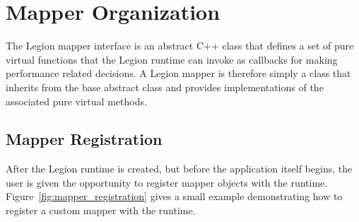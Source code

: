 \section{Mapper Organization}
\label{sec:mapping:org}

The Legion mapper interface is an abstract C++ class that defines a set of 
pure virtual functions that the Legion runtime can invoke as callbacks
for making performance related decisions. A Legion mapper is therefore 
simply a class that inherits from the base abstract class and provides 
implementations of the associated pure virtual methods.

\subsection{Mapper Registration}
\label{subsec:mapping:registration}

After the Legion runtime is created, but before the application itself
begins, the user is given the opportunity to register mapper objects 
with the runtime. Figure~\ref{fig:mapper_registration} gives a small
example demonstrating how to register a custom mapper with the runtime.

